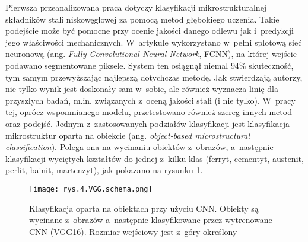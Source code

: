 Pierwsza przeanalizowana praca \cite{Azimi18} dotyczy klasyfikacji mikrostrukturalnej składników stali niskowęglowej za pomocą metod głębokiego uczenia. Takie podejście może być pomocne przy ocenie jakości danego odlewu jak i~predykcji jego właściwości mechanicznych. W~artykule wykorzystano w~pełni splotową sieć neuronową (ang. \textit{Fully Convolutional Neural Network}, FCNN), na której wejście podawano segmentowane piksele. System ten osiągnął niemal $94\%$ skuteczność, tym samym przewyższając najlepszą dotychczas metodę. Jak stwierdzają autorzy, nie tylko wynik jest doskonały sam w~sobie, ale również wyznacza linię dla przyszłych badań, m.in. związanych z~oceną jakości stali (i nie tylko). W~pracy tej, oprócz wspomnianego modelu, przetestowano również szereg innych metod oraz podejść. Jednym z~zastosowanych podziałów klasyfikacji jest klasyfikacja mikrostruktur oparta na obiekcie (ang. \textit{object-based microstructural classification}). Polega ona na wycinaniu obiektów z~obrazów, a~następnie klasyfikacji wyciętych kształtów do jednej z~kilku klas (ferryt, cementyt, austenit, perlit, bainit, martenzyt), jak pokazano na rysunku \ref{fig:mesh4}.  
\begin{figure}[h]
    \centering
    \texttt{[image: rys.4.VGG.schema.png]}
    \caption{Klasyfikacja oparta na obiektach przy użyciu CNN. Obiekty są wycinane z~obrazów a~następnie klasyfikowane przez wytrenowane CNN (VGG16). Rozmiar wejściowy jest z~góry określony \cite{Azimi18}}
    \label{fig:mesh4}
\end{figure}
